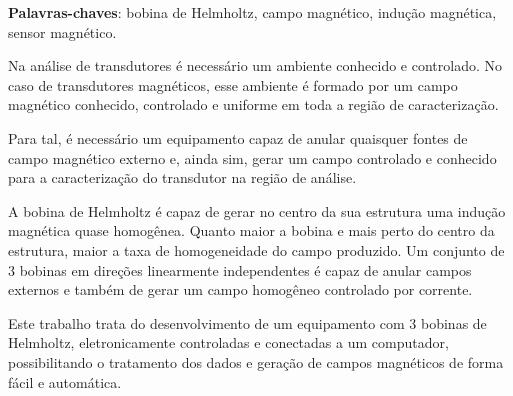 \documentclass{ifscTCC} %
\begin{document}
\setlength{\absparsep}{18pt} %

\begin{resumo}

\noindent
\textbf{Palavras-chaves}: bobina de Helmholtz, campo magnético, indução magnética, sensor magnético. 

Na análise de transdutores é necessário um ambiente conhecido e controlado. No caso de transdutores magnéticos, esse ambiente é formado por um campo magnético conhecido, controlado e uniforme em toda a região de caracterização.

Para tal, é necessário um equipamento capaz de anular quaisquer fontes de campo magnético externo e, ainda sim, gerar um campo controlado e conhecido para a caracterização do transdutor na região de análise.

A bobina de Helmholtz é capaz de gerar no centro da sua estrutura uma indução magnética quase homogênea. Quanto maior a bobina e mais perto do centro da estrutura, maior a taxa de homogeneidade do campo produzido. Um conjunto de 3 bobinas em direções linearmente independentes é capaz de anular campos externos e também de gerar um campo homogêneo controlado por corrente.

Este trabalho trata do desenvolvimento de um equipamento com 3 bobinas de Helmholtz, eletronicamente controladas e conectadas a um computador, possibilitando o tratamento dos dados e geração de campos magnéticos de forma fácil e automática.

\end{resumo}
\end{document}
